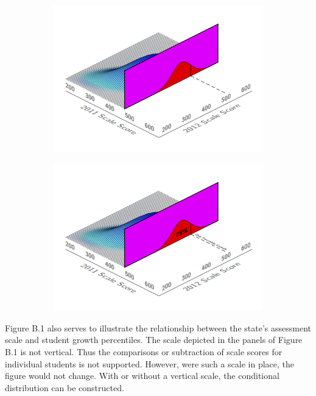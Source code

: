 \documentclass[12pt]{article}
\begin{document}
\begin{figure}[H]
\begin{subfigure}[b]{0.5\textwidth}
    \includegraphics[width=\textwidth]{../img/Appendices/SGP_Method/bidensity_p3.jpg}
  \end{subfigure}
  \begin{subfigure}[b]{0.5\textwidth}
    \includegraphics[width=\textwidth]{../img/Appendices/SGP_Method/bidensity_p4.jpg}
  \end{subfigure}
\end{figure}

Figure B.1 also serves to illustrate the relationship between the
state's assessment scale and student growth percentiles. The scale
depicted in the panels of Figure B.1 is not vertical. Thus the
comparisons or subtraction of scale scores for individual students is
not supported. However, were such a scale in place, the figure would not
change. With or without a vertical scale, the conditional distribution
can be constructed.
\end{document}
